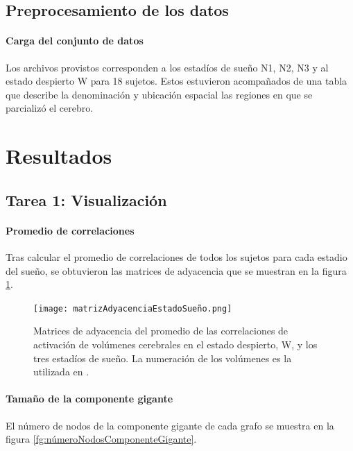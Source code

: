 \documentclass{article}
\begin{document}
\subsection{Preprocesamiento de los datos}

\paragraph{Carga del conjunto de datos} 
Los archivos provistos corresponden a los estadíos de sueño N1, N2, N3 y al estado despierto W para 18 sujetos.
Estos estuvieron acompañados de una tabla que describe la denominación y  ubicación espacial las regiones en que se parcializó el cerebro.


\section{Resultados}

\subsection{Tarea 1: Visualización}

\paragraph*{Promedio de correlaciones}
Tras calcular el promedio de correlaciones de todos los sujetos para cada estadio del sueño, se obtuvieron las matrices de adyacencia que se muestran en la figura \ref{fg:matrizAdyacenciaEstadoSueño}.

\begin{figure}[ht]
  \centering
  \texttt{[image: matrizAdyacenciaEstadoSueño.png]}
  \caption{Matrices de adyacencia del promedio de las correlaciones de activación de volúmenes cerebrales en el estado despierto, W, y los tres estadíos de sueño. La numeración de los volúmenes es la utilizada en \cite{tzourio-mazoyer_automated_2002}.
	}
	\label{fg:matrizAdyacenciaEstadoSueño}
\end{figure}


\paragraph*{Tamaño de la componente gigante} 
El número de nodos de la componente gigante de cada grafo se muestra en la figura \ref{fg:númeroNodosComponenteGigante}.
\end{document}
